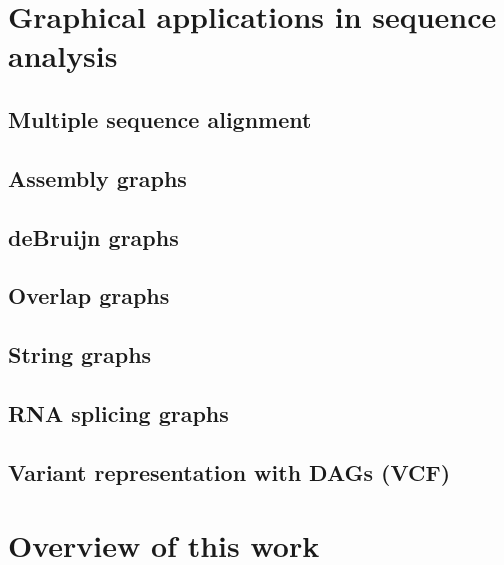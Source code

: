 \section{Graphical applications in sequence analysis}

\subsection{Multiple sequence alignment}

\subsection{Assembly graphs}

\subsection{deBruijn graphs}

\subsection{Overlap graphs}

\subsection{String graphs}

\subsection{RNA splicing graphs}

\subsection{Variant representation with DAGs (VCF)}

\section{Overview of this work}

